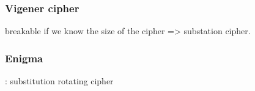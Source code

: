 \subsubsection{Vigener cipher }
breakable if we know the size of the
cipher => substation cipher.\\

\subsubsection{Enigma }
: substitution rotating cipher\\








